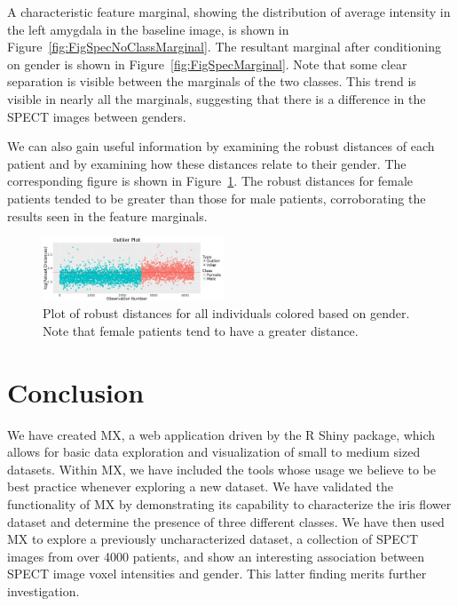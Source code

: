 \documentclass[twoside,leqno,twocolumn]{article}
\begin{document}
A characteristic feature marginal, showing the distribution of average intensity in the left amygdala in the baseline image, is shown in Figure~\ref{fig:FigSpecNoClassMarginal}. The resultant marginal after conditioning on gender is shown in Figure~\ref{fig:FigSpecMarginal}. Note that some clear separation is visible between the marginals of the two classes. This trend is visible in nearly all the marginals, suggesting that there is a difference in the SPECT images between genders.

We can also gain useful information by examining the robust distances of each patient and by examining how these distances relate to their gender. The corresponding figure is shown in Figure~\ref{fig:FigSpecOutlierPlot}. The robust distances for female patients tended to be greater than those for male patients, corroborating the results seen in the feature marginals.

\begin{figure}[t]
	\centering
	\includegraphics[width=0.48\textwidth,valign=t]{Figures/Spect_Gender/OutlierPlot.png}
	\caption{Plot of robust distances for all individuals colored based on gender. Note that female patients tend to have a greater distance.}
	\label{fig:FigSpecOutlierPlot}
\end{figure}

\section{Conclusion}
\label{sec:conc}

We have created MX, a web application driven by the R Shiny package, which allows for basic data exploration and visualization of small to medium sized datasets. Within MX, we have included the tools whose usage we believe to be best practice whenever exploring a new dataset. We have validated the functionality of MX by demonstrating its capability to characterize the iris flower dataset and determine the presence of three different classes. We have then used MX to explore a previously uncharacterized dataset, a collection of SPECT images from over 4000 patients, and show an interesting association between SPECT image voxel intensities and gender. This latter finding merits further investigation.
\end{document}
